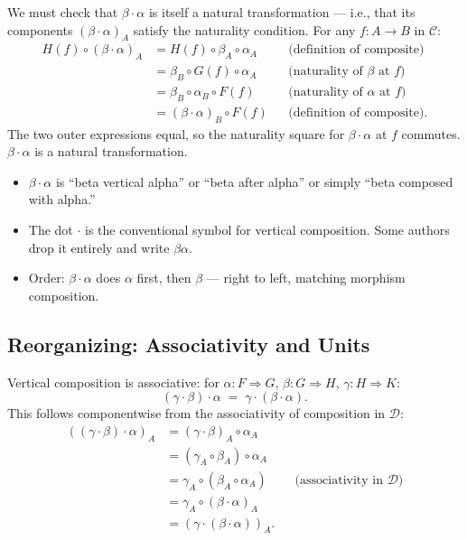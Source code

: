 We must check that $\beta \cdot \alpha$ is itself a natural transformation
--- i.e., that its components $(\beta \cdot \alpha)_A$ satisfy the
naturality condition. For any $f : A \to B$ in $\mathcal{C}$:
\begin{align*}
  H(f) \circ (\beta \cdot \alpha)_A
    &= H(f) \circ \beta_A \circ \alpha_A
       && \text{(definition of composite)} \\
    &= \beta_B \circ G(f) \circ \alpha_A
       && \text{(naturality of $\beta$ at $f$)} \\
    &= \beta_B \circ \alpha_B \circ F(f)
       && \text{(naturality of $\alpha$ at $f$)} \\
    &= (\beta \cdot \alpha)_B \circ F(f)
       && \text{(definition of composite)}.
\end{align*}
The two outer expressions equal, so the naturality square for
$\beta \cdot \alpha$ at $f$ commutes. $\beta \cdot \alpha$ is a natural
transformation.

\begin{howtosay}
\begin{itemize}
  \item $\beta \cdot \alpha$ is ``beta vertical alpha'' or ``beta after
        alpha'' or simply ``beta composed with alpha.''
  \item The dot $\cdot$ is the conventional symbol for vertical composition.
        Some authors drop it entirely and write $\beta \alpha$.
  \item Order: $\beta \cdot \alpha$ does $\alpha$ first, then $\beta$ ---
        right to left, matching morphism composition.
\end{itemize}
\end{howtosay}

\subsection{Reorganizing: Associativity and Units}

Vertical composition is associative: for $\alpha : F \Rightarrow G$,
$\beta : G \Rightarrow H$, $\gamma : H \Rightarrow K$:
\begin{equation*}
  (\gamma \cdot \beta) \cdot \alpha \;=\; \gamma \cdot (\beta \cdot \alpha).
\end{equation*}
This follows componentwise from the associativity of composition in
$\mathcal{D}$:
\begin{align*}
  ((\gamma \cdot \beta) \cdot \alpha)_A
    &= (\gamma \cdot \beta)_A \circ \alpha_A \\
    &= (\gamma_A \circ \beta_A) \circ \alpha_A \\
    &= \gamma_A \circ (\beta_A \circ \alpha_A)
       && \text{(associativity in $\mathcal{D}$)} \\
    &= \gamma_A \circ (\beta \cdot \alpha)_A \\
    &= (\gamma \cdot (\beta \cdot \alpha))_A.
\end{align*}

